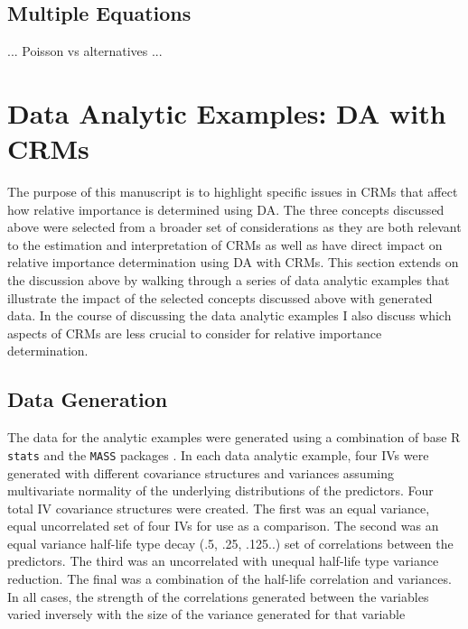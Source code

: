 \documentclass[ShortAfour,times,sageapa]{sagej}
\begin{document}
	
	\subsection{Multiple Equations}
	
	... Poisson vs alternatives ...
	
\section{Data Analytic Examples: DA with CRMs}
	
	The purpose of this manuscript is to highlight specific issues in CRMs that affect how relative importance is determined using DA.
	The three concepts discussed above were selected from a broader set of considerations as they are both relevant to the estimation and interpretation of CRMs as well as have direct impact on relative importance determination using DA with CRMs.
	This section extends on the discussion above by walking through a series of data analytic examples that illustrate the impact of the selected concepts discussed above with generated data.
	In the course of discussing the data analytic examples I also discuss which aspects of CRMs are less crucial to consider for relative importance determination.
	
	\subsection{Data Generation}
	
	The data for the analytic examples were generated using a combination of base R \texttt{stats} \cite{R} and the \texttt{MASS} packages \cite{MASS}.
	In each data analytic example, four IVs were generated with different covariance structures and variances assuming multivariate normality of the underlying distributions of the predictors.
	Four total IV covariance structures were created.  
	The first was an equal variance, equal uncorrelated set of four IVs for use as a comparison.  
	The second was an equal variance half-life type decay (.5, .25, .125..) set of correlations between the predictors.  
	The third was an uncorrelated with unequal half-life type variance reduction.  
	The final was a combination of the half-life correlation and variances.
	In all cases, the strength of the correlations generated between the variables varied inversely with the size of the variance generated for that variable %
	
\end{document}
